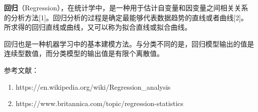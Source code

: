 
\textbf{回归}（Regression），在统计学中，是一种用于估计自变量和因变量之间相关关系的分析方法[1]。回归分析的过程是确定最能够代表数据趋势的直线或者曲线[2]。所求得的回归直线或曲线，又可以称为拟合直线或拟合曲线。

回归也是一种机器学习中的基本建模方法。与分类不同的是，回归模型输出的值是连续型数值，而分类模型的输出值是有限个离散值。



参考文献：
\begin{enumerate}
\item https://en.wikipedia.org/wiki/Regression_analysis
\item https://www.britannica.com/topic/regression-statistics
\end{enumerate}